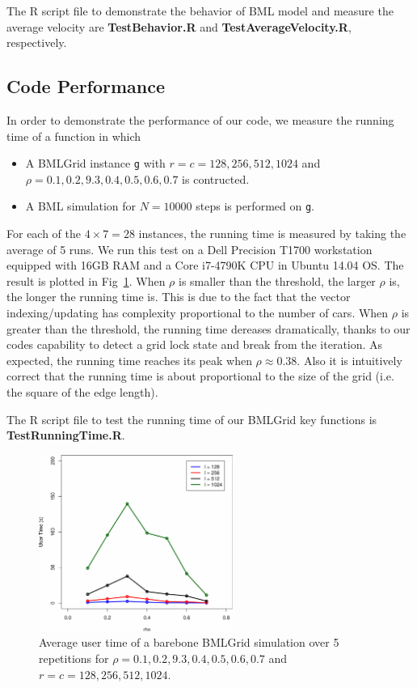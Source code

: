 \documentclass[twocolumn]{article}
\begin{document}
The R script file to demonstrate the behavior of BML model and measure the
average velocity are \textbf{TestBehavior.R} and
\textbf{TestAverageVelocity.R}, respectively.

\subsection{Code Performance}
In order to demonstrate the performance of our code, we measure the running time
of a function in which
\begin{itemize}
    \item A BMLGrid instance \texttt{g} with $r=c=128,256,512,1024$ and
    $\rho=0.1,0.2,9.3,0.4,0.5,0.6,0.7$ is contructed.
    \item A BML simulation for $N=10000$ steps is performed on \texttt{g}.
\end{itemize}
For each of the $4\times7 = 28$ instances, the running time is measured by
taking the average of 5 runs. We run this test on a Dell Precision T1700
workstation equipped with 16GB RAM and a Core i7-4790K CPU in Ubuntu 14.04 OS.
The result is plotted in Fig~\ref{fig:running_time}. When $\rho$ is smaller than
the threshold, the larger $\rho$ is, the longer the running time is. This is due
to the fact that the vector indexing/updating has complexity proportional to the
number of cars. When $\rho$ is greater than the threshold, the running time
dereases dramatically, thanks to our codes capability to detect a grid lock
state and break from the iteration. As expected, the running time reaches its
peak when $\rho\approx0.38$. Also it is intuitively correct that the running
time is about proportional to the size of the grid (i.e. the square of the edge
length).

The R script file to test the running time of our BMLGrid key functions is
\textbf{TestRunningTime.R}.

\begin{figure}[h]
    \centering
    \includegraphics[width=2.5in]{figs/TestRunningTime.pdf}
    \caption{Average user time of a barebone BMLGrid simulation over 5
    repetitions for $\rho=0.1,0.2,9.3,0.4,0.5,0.6,0.7$ and
    $r=c=128,256,512,1024$.}
    \label{fig:running_time}
\end{figure}
\end{document}
